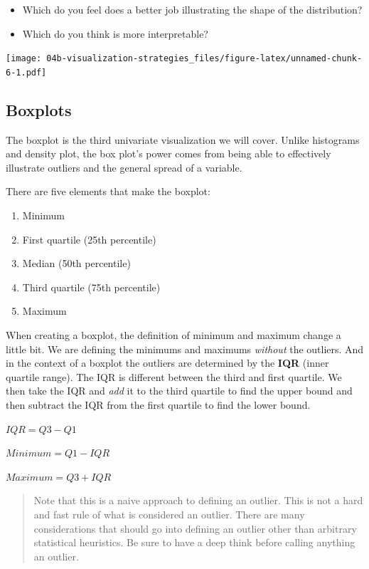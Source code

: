 \documentclass[
]{book}
\providecommand{\tightlist}{%
  \setlength{\itemsep}{0pt}\setlength{\parskip}{0pt}}
\begin{document}
\begin{itemize}
\tightlist
\item
  Which do you feel does a better job illustrating the shape of the distribution?
\item
  Which do you think is more interpretable?
\end{itemize}

\texttt{[image: 04b-visualization-strategies\_files/figure-latex/unnamed-chunk-6-1.pdf]}

\hypertarget{boxplots}{%
\subsection{Boxplots}\label{boxplots}}

The boxplot is the third univariate visualization we will cover. Unlike histograms and density plot, the box plot's power comes from being able to effectively illustrate outliers and the general spread of a variable.

There are five elements that make the boxplot:

\begin{enumerate}
\def\labelenumi{\arabic{enumi}.}
\tightlist
\item
  Minimum
\item
  First quartile (25th percentile)
\item
  Median (50th percentile)
\item
  Third quartile (75th percentile)
\item
  Maximum
\end{enumerate}

When creating a boxplot, the definition of minimum and maximum change a little bit. We are defining the minimums and maximums \emph{without} the outliers. And in the context of a boxplot the outliers are determined by the \textbf{IQR} (inner quartile range). The IQR is different between the third and first quartile. We then take the IQR and \emph{add} it to the third quartile to find the upper bound and then subtract the IQR from the first quartile to find the lower bound.

\(IQR = Q3 - Q1\)

\(Minimum = Q1 - IQR\)

\(Maximum = Q3 + IQR\)

\begin{quote}
Note that this is a naive approach to defining an outlier. This is not a hard and fast rule of what is considered an outlier. There are many considerations that should go into defining an outlier other than arbitrary statistical heuristics. Be sure to have a deep think before calling anything an outlier.
\end{quote}
\end{document}

